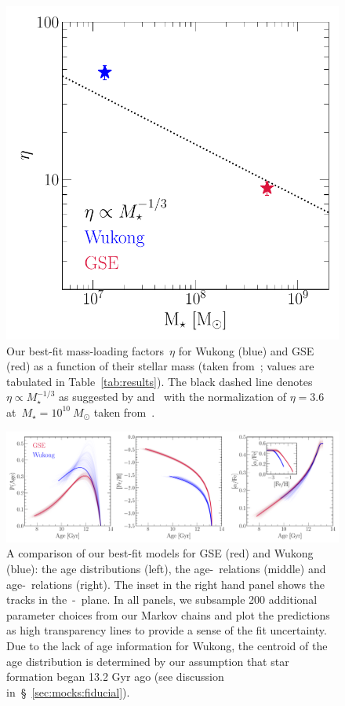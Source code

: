 \documentclass[ms.tex]{subfiles}
\begin{document}
\begin{figure}
\centering
\includegraphics[scale = 0.6]{gse_wukong_eta.pdf}
\caption{
Our best-fit mass-loading factors~$\eta$ for Wukong (blue) and GSE (red) as
a function of their stellar mass (taken from~\citealt{Naidu2022}; values are
tabulated in Table~\ref{tab:results}).
The black dashed line denotes~$\eta \propto M_\star^{-1/3}$ as suggested by
\citet{Finlator2008} and~\citet{Peeples2011} with the normalization of
$\eta = 3.6$ at~$M_\star = 10^{10}~M_\odot$ taken from~\citet{Muratov2015}.
}
\label{fig:gse_wukong_eta}
\end{figure}

\begin{figure}
\centering
\includegraphics[scale = 0.45]{gse_wukong_comparison.pdf}
\caption{
A comparison of our best-fit models for GSE (red) and Wukong (blue): the age
distributions (left), the age-\feh~relations (middle) and age-\afe~relations
(right).
The inset in the right hand panel shows the tracks in the~\afe-\feh~plane.
In all panels, we subsample 200 additional parameter choices from our Markov
chains and plot the predictions as high transparency lines to provide a sense
of the fit uncertainty.
Due to the lack of age information for Wukong, the centroid of the age
distribution is determined by our assumption that star formation began 13.2
Gyr ago (see discussion in~\S~\ref{sec:mocks:fiducial}).
}
\label{fig:comparison}
\end{figure}
\end{document}

